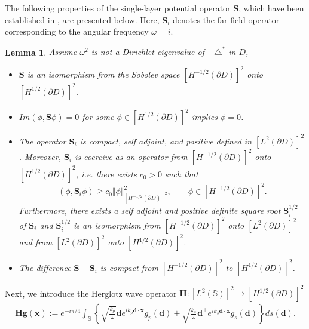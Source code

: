 \documentclass[11pt,reqno,twoside]{amsart}
\newtheorem{lem}{Lemma}[section]
\theoremstyle{definition}
\theoremstyle{remark}
\numberwithin{equation}{section}
\begin{document}
	The following properties of the single-layer potential operator $\mathbf S$, which have been established in \cite{Aren01}, are presented below. Here, $\mathbf{S}_i$ denotes the far-field operator corresponding to the angular frequency $\omega = i$.
	 \begin{lem}\label{SProperty}%
	 	Assume $\omega^2$ is not a Dirichlet eigenvalue of $-\triangle^*$ in $D$,
	 	\begin{itemize}
	 		\item [(1).] $\mathbf S$ is an isomorphism from the Sobolev space $\left[H^{-1/2}\left(\partial D\right) \right] ^2 $ onto $\left[H^{1/2}\left(\partial D\right) \right] ^2$.
	 		\item [(2).] $Im\left( \phi,\mathbf S\phi\right) =0$ for some $\phi \in \left[H^{1/2}\left(\partial D\right) \right] ^2$ implies $\phi=0$.
	 		\item [(3).] The operator $\mathbf S_i$ is compact, self adjoint, and positive defined  in $\left[L^2\left(\partial D\right) \right] ^2 $. Moreover, $\mathbf S_i$ is coercive as an operator from $\left[H^{-1/2}\left(\partial D\right) \right] ^2 $ onto $\left[H^{1/2}\left(\partial D\right) \right] ^2$, i.e. there exists $c_0>0$ such that
	 		$$
	 		\left( \phi,\mathbf S_i \phi\right) \geq c_0\Vert \phi\Vert^2_{\left[H^{-1/2}\left(\partial D\right) \right] ^2}, \qquad \phi \in \left[H^{-1/2}\left(\partial D\right) \right] ^2.
	 		$$
	 		Furthermore, there exists a self adjoint and positive definite square root $\mathbf S_{i}^{1/2}$ of $\mathbf S_i$ and $\mathbf S_{i}^{1/2}$ is an isomorphism from $\left[H^{-1/2}\left(\partial D\right) \right] ^2 $ onto $\left[L^2\left(\partial D\right) \right] ^2 $ and from $\left[L^2\left(\partial D\right) \right] ^2 $ onto $\left[H^{1/2}\left(\partial D\right) \right] ^2 $.
	 		\item [(4).] The difference $\mathbf S - \mathbf S_i$ is compact from $\left[H^{-1/2}\left(\partial D\right) \right] ^2 $ to $\left[H^{1/2}\left(\partial D\right) \right] ^2$.
	 	\end{itemize}
	 \end{lem}
	 	 Next, we introduce the Herglotz wave operator $\mathbf H: \left[L^2\left(\mathbb S\right) \right] ^2 \to \left[H^{1/2}\left(\partial D\right) \right] ^2$
	 	\begin{align}\label{eq:HerglotzOperatorD}
	 		\mathbf{Hg}\left( \mathbf x\right) :=e^{-i\pi /4} \int_{\mathbb S}  \left\lbrace \sqrt{\frac{k_p}{\omega}}\mathbf{d} e^{ik_p\mathbf{d}\cdot\mathbf{x}}g_p(\mathbf{d})+\sqrt{\frac{k_s}{\omega}}\mathbf{d}^{\perp} e^{ik_s\mathbf{d}\cdot\mathbf{x}}g_s(\mathbf{d})\right\rbrace ds(\mathbf{d}).
	 	\end{align}
\end{document}
